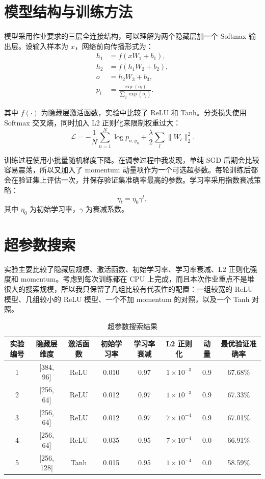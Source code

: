 \documentclass[UTF8,a4paper,11pt,fontset=none]{ctexart}
\begin{document}
\section{模型结构与训练方法}

模型采用作业要求的三层全连接结构，可以理解为两个隐藏层加一个 Softmax 输出层。设输入样本为 $x$，网络前向传播形式为：
\begin{align}
  h_1 &= f(xW_1+b_1),\\
  h_2 &= f(h_1W_2+b_2),\\
  o &= h_2W_3+b_3,\\
  p_i &= \frac{\exp(o_i)}{\sum_j \exp(o_j)}.
\end{align}

其中 $f(\cdot)$ 为隐藏层激活函数，实验中比较了 ReLU 和 Tanh。分类损失使用 Softmax 交叉熵，同时加入 L2 正则化来限制权重过大：
\begin{equation}
  \mathcal{L}=-\frac{1}{N}\sum_{n=1}^{N}\log p_{n,y_n}
  + \frac{\lambda}{2}\sum_l \lVert W_l\rVert_2^2.
\end{equation}

训练过程使用小批量随机梯度下降。在调参过程中我发现，单纯 SGD 后期会比较容易震荡，所以又加入了 momentum 动量项作为一个可选超参数。每轮训练后都会在验证集上评估一次，并保存验证集准确率最高的参数。学习率采用指数衰减策略：
\begin{equation}
  \eta_t = \eta_0 \gamma^t,
\end{equation}
其中 $\eta_0$ 为初始学习率，$\gamma$ 为衰减系数。

\section{超参数搜索}

实验主要比较了隐藏层规模、激活函数、初始学习率、学习率衰减、L2 正则化强度和 momentum。考虑到每次训练都在 CPU 上完成，而且本次作业重点不是堆很大的搜索规模，所以我只保留了几组比较有代表性的配置：一组较宽的 ReLU 模型、几组较小的 ReLU 模型、一个不加 momentum 的对照，以及一个 Tanh 对照。

\begin{table}[H]
  \centering
  \caption{超参数搜索结果}
  \small
  \begin{tabular}{cccccccc}
    \toprule
    实验编号 & 隐藏层维度 & 激活函数 & 初始学习率 & 学习率衰减 & L2 正则化 & 动量 & 最优验证准确率 \\
    \midrule
    1 & [384, 96] & ReLU & 0.010 & 0.97 & $1\times10^{-3}$ & 0.9 & 67.68\% \\
    2 & [256, 64] & ReLU & 0.012 & 0.97 & $1\times10^{-3}$ & 0.9 & 67.33\% \\
    3 & [256, 64] & ReLU & 0.012 & 0.97 & $7\times10^{-4}$ & 0.9 & 67.01\% \\
    4 & [256, 64] & ReLU & 0.035 & 0.95 & $7\times10^{-4}$ & 0.0 & 66.91\% \\
    5 & [256, 128] & Tanh & 0.015 & 0.95 & $1\times10^{-4}$ & 0.0 & 58.59\% \\
    \bottomrule
  \end{tabular}
\end{table}
\end{document}
